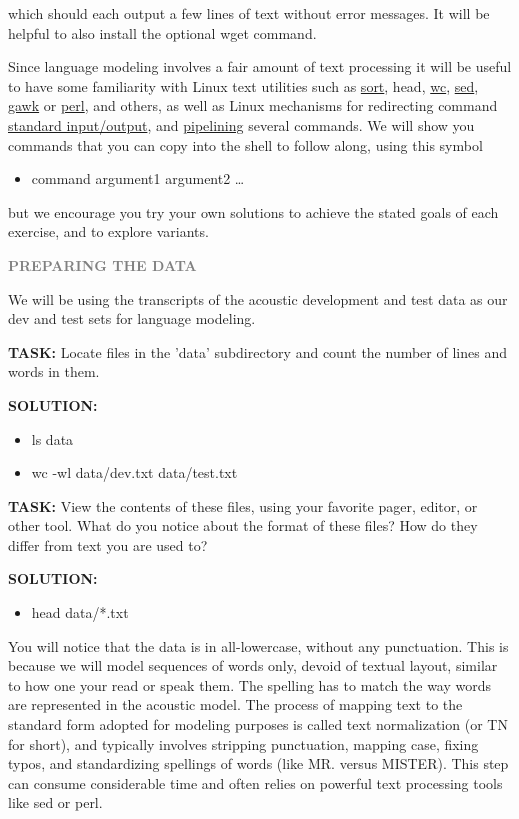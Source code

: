 which should each output a few lines of text without error messages. It will be helpful to also install the optional wget command.

Since language modeling involves a fair amount of text processing it will be useful to have some familiarity with Linux text utilities such as \href{http://man7.org/linux/man-pages/man1/sort.1.html}{sort}, head, \href{http://man7.org/linux/man-pages/man1/wc.1.html}{wc}, \href{http://man7.org/linux/man-pages/man1/sed.1.html}{sed}, \href{http://man7.org/linux/man-pages/man1/gawk.1.html}{gawk} or \href{https://perldoc.perl.org/perl.html}{perl}, and others, as well as Linux mechanisms for redirecting command \href{https://en.wikipedia.org/wiki/Standard_streams}{standard input/output}, and \href{https://en.wikipedia.org/wiki/Pipeline_\%28Unix\%29}{pipelining} several commands. We will show you commands that you can copy into the shell to follow along, using this symbol
\begin{itemize}
	\item command argument1 argument2 …
\end{itemize}

but we encourage you try your own solutions to achieve the stated goals of each exercise, and to explore variants.

{\bf \textcolor{gray}{PREPARING THE DATA}}

We will be using the transcripts of the acoustic development and test data as our dev and test sets for language modeling.

{\bf TASK:} Locate files in the 'data' subdirectory and count the number of lines and words in them.

{\bf SOLUTION:}
\begin{itemize}
	\item ls data
	\item wc -wl data/dev.txt data/test.txt
\end{itemize}

{\bf TASK:} View the contents of these files, using your favorite pager, editor, or other tool. What do you notice about the format of these files? How do they differ from text you are used to?

{\bf SOLUTION:}
\begin{itemize}
	\item head data/*.txt
\end{itemize}

You will notice that the data is in all-lowercase, without any punctuation. This is because we will model sequences of words only, devoid of textual layout, similar to how one your read or speak them. The spelling has to match the way words are represented in the acoustic model. The process of mapping text to the standard form adopted for modeling purposes is called text normalization (or TN for short), and typically involves stripping punctuation, mapping case, fixing typos, and standardizing spellings of words (like MR. versus MISTER). This step can consume considerable time and often relies on powerful text processing tools like sed or perl.

